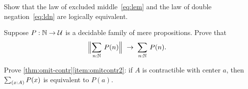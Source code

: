 \begin{ex}\label{ex:lem-ldn}
  Show that the law of excluded middle~\eqref{eq:lem} and the law of double negation~\eqref{eq:ldn} are logically equivalent.
\end{ex}

\begin{ex}\label{ex:decidable-choice}
  Suppose $P:\mathbb{N}\to\mathcal{U}$ is a decidable family of mere propositions.
  Prove that
  \[ \Brck{\sm{n:\nat} P(n)} \;\to\; \sm{n:\nat}P(n).\]
\end{ex}

\begin{ex}\label{ex:omit-contr2}
  Prove \autoref{thm:omit-contr}\ref{item:omitcontr2}: if $A$ is contractible with center $a$, then $\sm{x:A} P(x)$ is equivalent to $P(a)$.
\end{ex}



